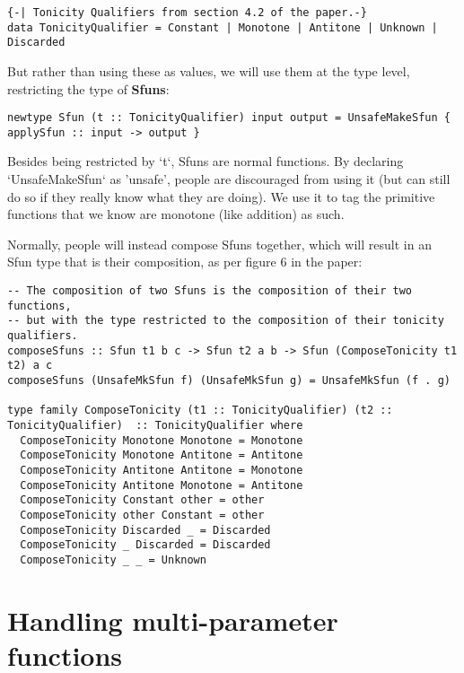 \documentclass[11pt]{article}
\begin{document}
\begin{verbatim}
{-| Tonicity Qualifiers from section 4.2 of the paper.-}
data TonicityQualifier = Constant | Monotone | Antitone | Unknown | Discarded
\end{verbatim}

But rather than using these as values, we will use them at the type level, restricting the type of \textbf{Sfuns}:

\begin{verbatim}
newtype Sfun (t :: TonicityQualifier) input output = UnsafeMakeSfun { applySfun :: input -> output }
\end{verbatim}

Besides being restricted by `t`, Sfuns are normal functions.
By declaring `UnsafeMakeSfun` as 'unsafe', people are discouraged from using it (but can still do so if they really know what they are doing).
We use it to tag the primitive functions that we know are monotone (like addition) as such.

Normally, people will instead compose Sfuns together, which will result in an Sfun type that is their composition, as per figure 6 in the paper:

\begin{verbatim}
-- The composition of two Sfuns is the composition of their two functions,
-- but with the type restricted to the composition of their tonicity qualifiers.
composeSfuns :: Sfun t1 b c -> Sfun t2 a b -> Sfun (ComposeTonicity t1 t2) a c
composeSfuns (UnsafeMkSfun f) (UnsafeMkSfun g) = UnsafeMkSfun (f . g)

type family ComposeTonicity (t1 :: TonicityQualifier) (t2 :: TonicityQualifier)  :: TonicityQualifier where
  ComposeTonicity Monotone Monotone = Monotone
  ComposeTonicity Monotone Antitone = Antitone
  ComposeTonicity Antitone Antitone = Monotone
  ComposeTonicity Antitone Monotone = Antitone
  ComposeTonicity Constant other = other
  ComposeTonicity other Constant = other
  ComposeTonicity Discarded _ = Discarded
  ComposeTonicity _ Discarded = Discarded
  ComposeTonicity _ _ = Unknown

\end{verbatim}



\section{Handling multi-parameter functions}
\label{sec:orga50398a}
\end{document}
